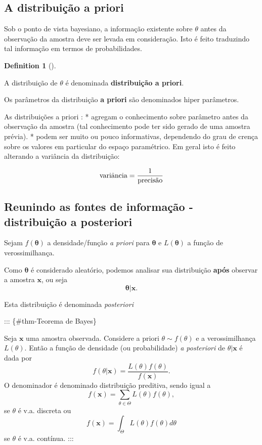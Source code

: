 \documentclass[
  letterpaper,
  DIV=11,
  numbers=noendperiod]{scrreprt}
\theoremstyle{definition}
\theoremstyle{definition}
\newtheorem{definition}{Definition}[chapter]
\theoremstyle{remark}
\begin{document}
\hypertarget{a-distribuiuxe7uxe3o-a-priori}{%
\subsection{A distribuição a
priori}\label{a-distribuiuxe7uxe3o-a-priori}}

Sob o ponto de vista bayesiano, a informação existente sobre \(\theta\)
antes da observação da amostra deve ser levada em consideração. Isto é
feito traduzindo tal informação em termos de probabilidades.

\begin{definition}[]\protect\hypertarget{def-}{}\label{def-}

A distribuição de \(\theta\) é denominada \textbf{distribuição a
priori}.

\end{definition}

Os parâmetros da distribuição \textbf{a priori} são denominados hiper
parâmetros.

As distribuições a priori : * agregam o conhecimento sobre parâmetro
antes da observação da amostra (tal conhecimento pode ter sido gerado de
uma amostra prévia). * podem ser muito ou pouco informativas, dependendo
do grau de crença sobre os valores em particular do espaço paramétrico.
Em geral isto é feito alterando a variância da distribuição:

\[\hbox{variância}=\frac{1}{\hbox{precisão}}\]

\hypertarget{reunindo-as-fontes-de-informauxe7uxe3o---distribuiuxe7uxe3o-a-posteriori}{%
\subsection{Reunindo as fontes de informação - distribuição a
posteriori}\label{reunindo-as-fontes-de-informauxe7uxe3o---distribuiuxe7uxe3o-a-posteriori}}

Sejam \(f(\boldsymbol{\theta})\) a densidade/função \textit{a priori}
para \(\boldsymbol{\theta}\) e \(L(\boldsymbol{\theta})\) a função de
verossimilhança.

Como \(\boldsymbol{\theta}\) é considerado aleatório, podemos analisar
sua distribuição \textbf{após} observar a amostra \(\boldsymbol{x}\), ou
seja \[\boldsymbol{\theta}|\boldsymbol{x}.\]

Esta distribuição é denominada \textit{posteriori}

::: \{\#thm-Teorema de Bayes\}

Seja \(\boldsymbol{x}\) uma amostra observada. Considere a priori
\(\theta\sim f(\theta)\) e a verossimilhança \(L(\theta)\). Então a
função de densidade (ou probabilidade) \textit{a posteriori} de
\(\theta|\boldsymbol{x}\) é dada por
\[f(\theta|\boldsymbol{x})=\frac{L(\theta)f(\theta)}{f(\boldsymbol{x})}.\]
O denominador é denominado distribuição preditiva, sendo igual a
\[f(\boldsymbol{x})=\sum_{\theta\in \Theta}L(\theta)f(\theta),\] se
\(\theta\) é v.a. discreta ou
\[f(\boldsymbol{x})=\int_{\Theta}L(\theta)f(\theta)d\theta\] se
\(\theta\) é v.a. contínua. :::
\end{document}
